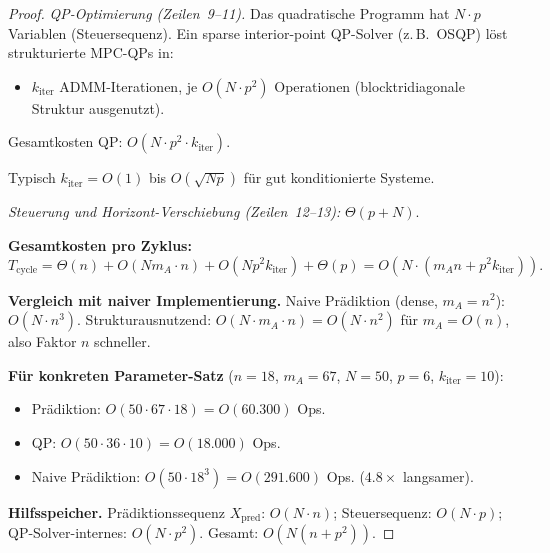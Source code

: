 \documentclass[a4paper,12pt]{report}
\theoremstyle{definition}
\begin{document}
\begin{proof}
		\textit{QP-Optimierung (Zeilen~9--11).}
		Das quadratische Programm hat $N \cdot p$ Variablen (Steuersequenz). Ein sparse interior-point QP-Solver (z.\,B.\ OSQP) löst strukturierte MPC-QPs in:
		\begin{itemize}
			\item $k_{\mathrm{iter}}$ ADMM-Iterationen, je $O(N \cdot p^2)$ Operationen (blocktridiagonale Struktur ausgenutzt).
		\end{itemize}
		Gesamtkosten QP: $O(N \cdot p^2 \cdot k_{\mathrm{iter}})$.

		Typisch $k_{\mathrm{iter}} = O(1)$ bis $O(\sqrt{Np})$ für gut konditionierte Systeme.

		\textit{Steuerung und Horizont-Verschiebung (Zeilen~12--13):} $\Theta(p + N)$.

		\textbf{Gesamtkosten pro Zyklus:}
		\[
			T_{\mathrm{cycle}} = \Theta(n) + O(N m_A \cdot n) + O(N p^2 k_{\mathrm{iter}}) + \Theta(p)
			= O\!\left(N \!\cdot\! (m_A n + p^2 k_{\mathrm{iter}})\right).
		\]

		\textbf{Vergleich mit naiver Implementierung.}
		Naive Prädiktion (dense, $m_A = n^2$): $O(N \cdot n^3)$.
		Strukturausnutzend: $O(N \cdot m_A \cdot n) = O(N \cdot n^2)$ für $m_A = O(n)$, also Faktor $n$ schneller.

		\textbf{Für konkreten Parameter-Satz} ($n = 18$, $m_A = 67$, $N = 50$, $p = 6$, $k_{\mathrm{iter}} = 10$):
		\begin{itemize}
			\item Prädiktion: $O(50 \cdot 67 \cdot 18) = O(60.300)$ Ops.
			\item QP: $O(50 \cdot 36 \cdot 10) = O(18.000)$ Ops.
			\item Naive Prädiktion: $O(50 \cdot 18^3) = O(291.600)$ Ops. ($4.8\times$ langsamer).
		\end{itemize}

		\textbf{Hilfsspeicher.} Prädiktionssequenz $X_{\mathrm{pred}}$: $O(N \cdot n)$; Steuersequenz: $O(N \cdot p)$; QP-Solver-internes: $O(N \cdot p^2)$. Gesamt: $O(N(n + p^2))$.
	\end{proof}
\end{document}
